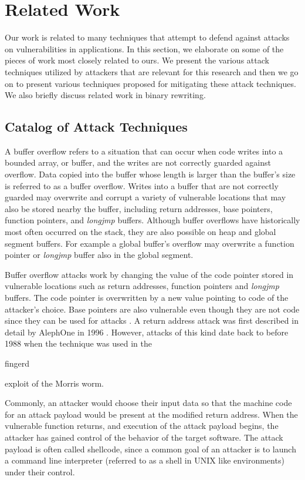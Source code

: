 \section{Related Work}
\label{sec:related}

Our work is related to many techniques that attempt to defend against
attacks on vulnerabilities in applications. In this section, we
elaborate on some of the pieces of work most closely related to
ours. We present the various attack techniques utilized by
attackers that are relevant for this research and then we go on to
present various techniques proposed for mitigating these attack
techniques. We also briefly discuss related work in
binary rewriting.

\subsection{Catalog of Attack Techniques}

 A buffer overflow refers to a
situation that can occur when code writes into a bounded array, or
buffer, and the writes are not correctly guarded against
overflow. Data copied into the buffer whose length is larger than the
buffer's size is referred to as a buffer overflow. Writes into a
buffer that are not correctly guarded may overwrite and corrupt a
variety of vulnerable locations that may also be stored nearby the
buffer, including return addresses, base pointers, function pointers,
and \emph{longjmp} buffers. Although buffer overflows have
historically most often occurred on the stack, they are also possible
on heap and global segment buffers.  For example a global buffer's
overflow may overwrite a function pointer or \emph{longjmp} buffer
also in the global segment.

Buffer overflow attacks work by changing the value of the code pointer
stored in vulnerable locations such as return addresses, function
pointers and \emph{longjmp} buffers. The code pointer is overwritten
by a new value pointing to code of the attacker's choice.  Base
pointers are also vulnerable even though they are not code since they
can be used for attacks \cite{wilander2003}. A return address attack
was first described in detail by AlephOne in 1996
\cite{one1996}. However, attacks of this kind date back to before 1988
when the technique was used in the \begin{em}fingerd\end{em} exploit
  of the Morris worm.

Commonly, an attacker would choose their input data so that the
machine code for an attack payload would be present at the modified
return address. When the vulnerable function returns, and execution of
the attack payload begins, the attacker has gained control of the
behavior of the target software. The attack payload is often called
shellcode, since a common goal of an attacker is to launch a command
line interpreter (referred to as a shell in UNIX like environments)
under their control.


